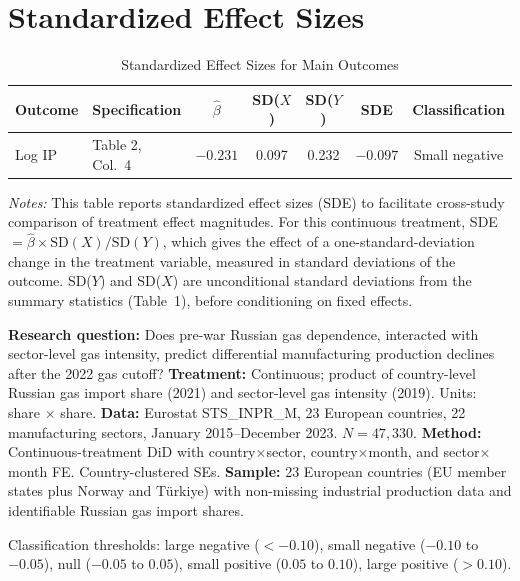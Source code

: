 \documentclass[12pt]{article}
\begin{document}
\section{Standardized Effect Sizes}
\label{sec:sde}

\begin{table}[H]
\centering
\caption{Standardized Effect Sizes for Main Outcomes}
\label{tab:sde}
\begin{tabular}{llccccc}
\toprule
Outcome & Specification & $\hat{\beta}$ & SD($X$) & SD($Y$) & SDE & Classification \\
\midrule
Log IP & Table 2, Col.\ 4 & $-0.231$ & 0.097 & 0.232 & $-0.097$ & Small negative \\
\bottomrule
\end{tabular}
\par\vspace{0.3em}
{\footnotesize \textit{Notes:} This table reports standardized effect sizes (SDE)
to facilitate cross-study comparison of treatment effect magnitudes.
For this continuous treatment, SDE $= \hat{\beta} \times \text{SD}(X) / \text{SD}(Y)$,
which gives the effect of a one-standard-deviation change in the treatment variable,
measured in standard deviations of the outcome.
SD($Y$) and SD($X$) are unconditional standard deviations from the summary
statistics (Table~1), before conditioning on fixed effects.

\textbf{Research question:} Does pre-war Russian gas dependence, interacted with sector-level gas intensity, predict differential manufacturing production declines after the 2022 gas cutoff?
\textbf{Treatment:} Continuous; product of country-level Russian gas import share (2021) and sector-level gas intensity (2019). Units: share $\times$ share.
\textbf{Data:} Eurostat STS\_INPR\_M, 23 European countries, 22 manufacturing sectors, January 2015--December 2023. $N = 47{,}330$.
\textbf{Method:} Continuous-treatment DiD with country$\times$sector, country$\times$month, and sector$\times$month FE. Country-clustered SEs.
\textbf{Sample:} 23 European countries (EU member states plus Norway and T\"{u}rkiye) with non-missing industrial production data and identifiable Russian gas import shares.

Classification thresholds:
large negative ($< -0.10$), small negative ($-0.10$ to $-0.05$),
null ($-0.05$ to $0.05$), small positive ($0.05$ to $0.10$),
large positive ($> 0.10$).}
\end{table}
\end{document}
